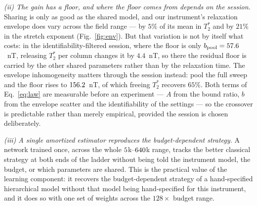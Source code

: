 \documentclass[aps,pra,twocolumn,superscriptaddress,nofootinbib]{revtex4-2}
\begin{document}
\emph{(ii) The gain has a floor, and where the floor comes from depends on the session.}
Sharing is only as good as the shared model, and our instrument's relaxation envelope does
vary across the field range --- by $5\%$ of its mean in $T_2^{*}$ and by $21\%$ in the
stretch exponent (Fig.~\ref{fig:env}). But that variation is not by itself what costs: in
the identifiability-filtered session, where the floor is only
$b_{\rm pool}=57.6$~nT, releasing $T_2^{*}$ per column changes it by $4.4$~nT, so there
the residual floor is carried by the other shared parameters rather than by the relaxation
time. The envelope inhomogeneity matters through the session instead: pool the full sweep
and the floor rises to $156.2$~nT, of which freeing $T_2^{*}$ recovers $65\%$. Both
terms of Eq.~\eqref{eq:law} are measurable before an experiment --- $A$ from the bound
ratio, $b$ from the envelope scatter and the identifiability of the settings --- so the
crossover is predictable rather than merely empirical, provided the session is chosen
deliberately.

\emph{(iii) A single amortized estimator reproduces the budget-dependent strategy.} A
network trained once, across the whole $5$k--$640$k range, tracks the better
classical strategy at both ends of the ladder without being told the instrument model, the
budget, or which parameters are shared. This is the practical value of the learning
component: it recovers the budget-dependent strategy of a hand-specified hierarchical
model without that model being hand-specified for this instrument, and it does so with one
set of weights across the $128\times$ budget range.
\end{document}
